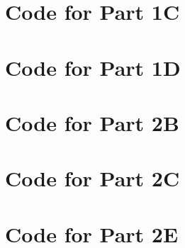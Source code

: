 \appendix
\newpage
\section{Code for Part 1C}
\newpage
\section{Code for Part 1D}
\newpage
\section{Code for Part 2B}
\newpage
\section{Code for Part 2C}
\newpage
\section{Code for Part 2E}
